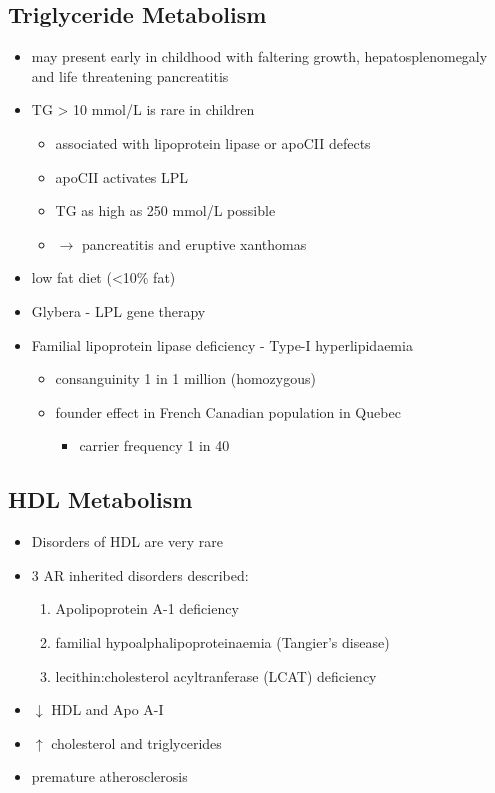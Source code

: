 \documentclass{scrartcl}
\begin{document}
\subsection{Triglyceride Metabolism}
\label{sec:org5545a98}
\begin{itemize}
\item may present early in childhood with faltering growth,
hepatosplenomegaly and life threatening pancreatitis
\item TG \textgreater{} 10 mmol/L is rare in children
\begin{itemize}
\item associated with lipoprotein lipase or apoCII defects
\item apoCII activates LPL
\item TG as high as 250 mmol/L possible
\item \(\to\) pancreatitis and eruptive xanthomas
\end{itemize}
\item low fat diet (<10\% fat)
\item Glybera - LPL gene therapy
\item Familial lipoprotein lipase deficiency - Type-I hyperlipidaemia
\begin{itemize}
\item consanguinity 1 in 1 million (homozygous)
\item founder effect in French Canadian population in Quebec
\begin{itemize}
\item carrier frequency 1 in 40
\end{itemize}
\end{itemize}
\end{itemize}
\subsection{HDL Metabolism}
\label{sec:orgbca5ed2}
\begin{itemize}
\item Disorders of HDL are very rare
\item 3 AR inherited disorders described:
\begin{enumerate}
\item Apolipoprotein A-1 deficiency
\item familial hypoalphalipoproteinaemia (Tangier’s disease)
\item lecithin:cholesterol acyltranferase (LCAT) deficiency
\end{enumerate}
\item \(\downarrow\) HDL and Apo A-I
\item \(\uparrow\) cholesterol and triglycerides
\item premature atherosclerosis
\end{itemize}
\end{document}
